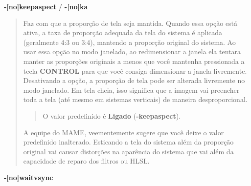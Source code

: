 \documentclass[letterpaper,10pt,brazil]{sphinxmanual}
\begin{document}
\label{commandline/commandline-all:mame-commandline-keepaspect}
\textbf{-{[}no{]}keepaspect} / \textbf{-{[}no{]}ka}
\begin{quote}

Faz com que a proporção de tela seja mantida. Quando essa opção está
ativa, a taxa de proporção adequada da tela do sistema é aplicada
(geralmente 4:3 ou 3:4), mantendo a proporção original do sistema.
Ao usar essa opção no modo janelado, ao redimensionar a janela ela
tentara manter as proporções originais a menos que você mantenha
pressionada a tecla \textbf{CONTROL} para que você consiga dimensionar a
janela livremente.
Desativando a opção, a proporção de tela pode ser alterada
livremente no modo janelado. Em tela cheia, isso significa que a
imagem vai preencher toda a tela (até mesmo em sistemas verticais)
de maneira desproporcional.
\begin{quote}

O valor predefinido é \textbf{Ligado} (\textbf{-keepaspect}).
\end{quote}

A equipe do MAME, veementemente sugere que você deixe o valor
predefinido inalterado. Esticando a tela do sistema além da
proporção original vai causar distorções na aparência do sistema
que vai além da capacidade de reparo dos filtros ou HLSL.
\end{quote}
\label{commandline/commandline-all:mame-commandline-waitvsync}
\textbf{-{[}no{]}waitvsync}
\end{document}
